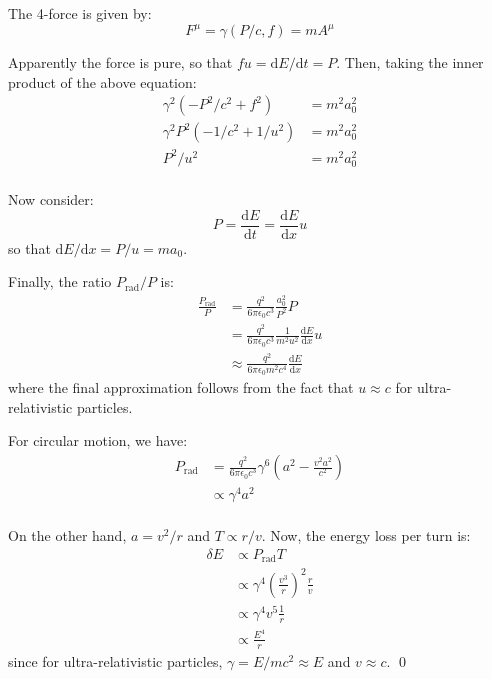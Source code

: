 \documentclass[12pt]{article}
\begin{document}
The 4-force is given by:
\begin{equation}
    F^{\mu} = \gamma (P/c, f) = m A^{\mu}
\end{equation}

Apparently the force is pure, so that $fu = \mathrm{d}E/\mathrm{d}t = P$. Then, taking the inner product of the above equation:
\begin{equation}
    \begin{split}
        \gamma^{2} (-P^{2}/c^{2} + f^{2}) &= m^{2} a_{0}^{2} \\
        \gamma^{2} P^{2} (-1/c^{2} + 1/u^{2}) &= m^{2} a_{0}^{2} \\
        P^{2}/u^{2} &= m^{2} a_{0}^{2} \\
    \end{split}
\end{equation}

Now consider:
\begin{equation}
    P = \frac{\mathrm{d}E}{\mathrm{d}t} = \frac{\mathrm{d}E}{\mathrm{d}x} u
\end{equation}
so that $\mathrm{d}E/\mathrm{d}x = P/u = m a_{0}$.

Finally, the ratio $P_{\text{rad}}/P$ is:
\begin{equation}
    \begin{split}
        \frac{P_{\text{rad}}}{P} &= \frac{q^{2}}{6\pi \epsilon_{0} c^{3}} \frac{a_{0}^{2}}{P^{2}} P \\
        &= \frac{q^{2}}{6\pi \epsilon_{0} c^{3}} \frac{1}{m^{2} u^{2}} \frac{\mathrm{d}E}{\mathrm{d}x} u \\
        &\approx \frac{q^{2}}{6\pi \epsilon_{0} m^{2} c^{4}} \frac{\mathrm{d}E}{\mathrm{d}x}
    \end{split}
\end{equation}
where the final approximation follows from the fact that $u \approx c$ for ultra-relativistic particles.

For circular motion, we have:
\begin{equation}
    \begin{split}
        P_{\text{rad}} &= \frac{q^{2}}{6\pi \epsilon_{0} c^{3}} \gamma^{6} \left( a^{2} - \frac{v^{2}a^{2}}{c^{2}} \right) \\
        &\propto \gamma^{4} a^{2} \\
    \end{split}
\end{equation}

On the other hand, $a = v^{2}/r$ and $T \propto r/v$. Now, the energy loss per turn is:
\begin{equation}
    \begin{split}
        \delta E &\propto P_{\text{rad}} T \\
        &\propto \gamma^{4} \left( \frac{v^{3}}{r} \right)^{2} \frac{r}{v} \\
        &\propto \gamma^{4} v^{5} \frac{1}{r} \\
        &\propto \frac{E^{4}}{r}
    \end{split}
\end{equation}
since for ultra-relativistic particles, $\gamma = E/mc^{2} \approx E$ and $v \approx c$.
\qed
\end{document}
